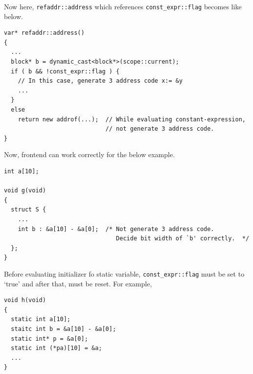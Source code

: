 Now here, {\tt{refaddr::address}} which references {\tt{const\_expr::flag}}
becomes like below.
\begin{verbatim}
var* refaddr::address()
{
  ...
  block* b = dynamic_cast<block*>(scope::current);
  if ( b && !const_expr::flag ) {
    // In this case, generate 3 address code x:= &y
    ...
  }
  else
    return new addrof(...);  // While evaluating constant-expression,
                             // not generate 3 address code.
}
\end{verbatim}
Now, frontend can work correctly for the below example.
\begin{verbatim}
int a[10];

void g(void)
{
  struct S {
    ...
    int b : &a[10] - &a[0];  /* Not generate 3 address code.
                                Decide bit width of `b' correctly.  */
  };
}
\end{verbatim}
Before evaluating initializer fo static variable,
{\tt{const\_expr::flag}} must be set to `true' and after that,
must be reset. For example,
\begin{verbatim}
void h(void)
{
  static int a[10];
  staitc int b = &a[10] - &a[0];
  static int* p = &a[0];
  static int (*pa)[10] = &a;
  ...
}
\end{verbatim}
